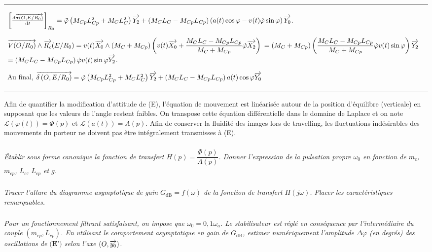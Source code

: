 \documentclass[10pt,fleqn]{article} %
\begin{document}
\begin{multicols}{2}
\begin{corrige}
\begin{tabular}{|p{.9\linewidth}}
$\left[\frac{\text{d} \overrightarrow{\sigma \left( {O}, {E} /{R_0}\right)}}{\text{d} t}\right]_{R_0} =\ddot{\varphi}\left(M_{Cp}L_{Cp}^2+M_{C}L_{C}^2 \right)\overrightarrow{Y_2}+\left( M_CL_C-M_{Cp}L_{Cp}\right) \left( a(t)\cos\varphi - v(t)\dot{\varphi}\sin\varphi \right)\overrightarrow{Y_0}$.

$\overrightarrow{V(O/R_0)}\wedge \overrightarrow{R_c}(E/R_0) =v(t)\overrightarrow{X_0} \wedge \left(M_C+M_{Cp}\right) \left( v(t)\overrightarrow{X_0}+\dfrac{M_CL_C-M_{Cp}L_{Cp}}{M_C+M_{Cp}}\dot{\varphi}\overrightarrow{X_2} \right)$
$=\left(M_C+M_{Cp}\right) \left( \dfrac{M_CL_C-M_{Cp}L_{Cp}}{M_C+M_{Cp}}\dot{\varphi}v(t)\sin\varphi  \right)\overrightarrow{Y_2} $
$=\left( M_CL_C-M_{Cp}L_{Cp}  \right)\dot{\varphi}v(t)\sin\varphi\overrightarrow{Y_2} $.

Au final, $\overrightarrow{\delta \left( {O}, {E} /{R_0}\right)}=\ddot{\varphi}\left(M_{Cp}L_{Cp}^2+M_{C}L_{C}^2 \right)\overrightarrow{Y_2}+\left( M_CL_C-M_{Cp}L_{Cp}\right)  a(t)\cos\varphi \overrightarrow{Y_0}$
\\

\end{tabular}

\end{corrige}
\else
\fi



Afin de quantifier la modification d’attitude de (E), l'équation de mouvement est linéarisée autour de la position
d'équilibre (verticale) en supposant que les valeurs de l'angle restent faibles. On transpose cette équation
différentielle dans le domaine de Laplace et on note $\mathcal{L}\left(\varphi(t) \right)=\Phi(p)$ et $\mathcal{L}\left(a(t) \right)=A(p)$. 
Afin de conserver la fluidité des images lors de travelling, les fluctuations indésirables des mouvements du porteur ne
doivent pas être intégralement transmisses à (E).


\subparagraph{}
\textit{Établir sous forme canonique la fonction de transfert $H(p)=\dfrac{\Phi(p)}{A(p)}$. Donner l'expression de la pulsation propre $\omega_0$ en fonction de $m_c$, $m_{cp}$, $L_{c}$, $L_{cp}$ et $g$.}
\ifprof
\begin{corrige}
\end{corrige}
\else
\fi

\subparagraph{}
\textit{Tracer l'allure du diagramme asymptotique de gain $G_{\text{dB}}=f\left( \omega\right)$ de la fonction de transfert $H\left(j\omega\right)$. Placer les caractéristiques remarquables.}
\ifprof
\begin{corrige}
\end{corrige}
\else
\fi


\subparagraph{}
\textit{Pour un fonctionnement filtrant satisfaisant, on impose que $\omega_0=0,1\omega_a$. Le stabilisateur est réglé en
conséquence par l’intermédiaire du couple $\left( m_{cp},L_{cp}\right)$. En utilisant le comportement asymptotique en gain de $G_{\text{dB}}$, estimer numériquement l'amplitude $\Delta \varphi$ (en degrés) des oscillations de $\textbf{(E')}$
selon l'axe $\left(O,\overrightarrow{y_0}\right)$.}
\ifprof
\begin{corrige}
\end{corrige}
\else
\fi



\end{multicols}
\end{document}
